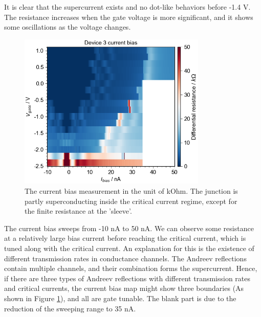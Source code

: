 It is clear that the supercurrent exists and no dot-like behaviors before -1.4 V. The resistance increases when the gate voltage is more significant, and it shows some oscillations as the voltage changes.

\begin{figure}[h!]
    \centering
    \includegraphics[width=0.8\textwidth]{Pic/D3Ibias.png}
    \caption{The current bias measurement in the unit of kOhm. The junction is partly superconducting inside the critical current regime, except for the finite resistance at the 'sleeve'.}
    \label{D3 current bias}
\end{figure}

The current bias sweeps from -10 nA to 50 nA. We can observe some resistance at a relatively large bias current before reaching the critical current, which is tuned along with the critical current. An explanation for this is the existence of different transmission rates in conductance channels. The Andreev reflections contain multiple channels, and their combination forms the supercurrent. Hence, if there are three types of Andreev reflections with different transmission rates and critical currents, the current bias map might show three boundaries (As shown in Figure \ref{D3 current bias}), and all are gate tunable. The blank part is due to the reduction of the sweeping range to 35 nA.


